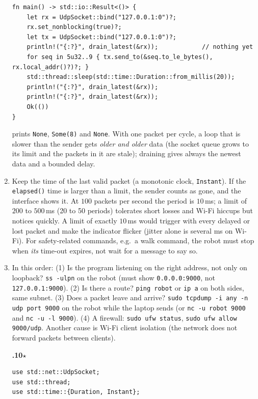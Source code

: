 \begin{enumerate}[label=\textbf{\ansnum.\arabic*}]
\begin{verbatim}
fn main() -> std::io::Result<()> {
    let rx = UdpSocket::bind("127.0.0.1:0")?;
    rx.set_nonblocking(true)?;
    let tx = UdpSocket::bind("127.0.0.1:0")?;
    println!("{:?}", drain_latest(&rx));            // nothing yet
    for seq in 5u32..9 { tx.send_to(&seq.to_le_bytes(), rx.local_addr()?)?; }
    std::thread::sleep(std::time::Duration::from_millis(20));
    println!("{:?}", drain_latest(&rx));
    println!("{:?}", drain_latest(&rx));
    Ok(())
}
\end{verbatim}
prints \verb!None!, \verb!Some(8)! and \verb!None!. With one packet per cycle, a loop that is slower than the sender gets \emph{older and older} data (the socket queue grows to its limit and the packets in it are stale); draining gives always the newest data and a bounded delay.
  \item Keep the time of the last valid packet (a monotonic clock, \verb!Instant!). If the \verb!elapsed()! time is larger than a limit, the sender counts as gone, and the interface shows it. At $100$ packets per second the period is $10$\,ms; a limit of $200$ to $500$\,ms (20 to 50 periods) tolerates short losses and Wi-Fi hiccups but notices quickly. A limit of exactly $10$\,ms would trigger with every delayed or lost packet and make the indicator flicker (jitter alone is several ms on Wi-Fi). For safety-related commands, e.g.\ a walk command, the robot must stop when \emph{its} time-out expires, not wait for a message to say so.
  \item In this order: (1) Is the program listening on the right address, not only on loopback? \verb!ss -ulpn! on the robot (must show \verb!0.0.0.0:9000!, not \verb!127.0.0.1:9000!). (2) Is there a route? \verb!ping robot! or \verb!ip a! on both sides, same subnet. (3) Does a packet leave and arrive? \verb!sudo tcpdump -i any -n udp port 9000! on the robot while the laptop sends (or \verb!nc -u robot 9000! and \verb!nc -u -l 9000!). (4) A firewall: \verb!sudo ufw status!, \verb!sudo ufw allow 9000/udp!. Another cause is Wi-Fi client isolation (the network does not forward packets between clients).
  \item[\textbf{\ansnum.10}$\star$]
\begin{verbatim}
use std::net::UdpSocket;
use std::thread;
use std::time::{Duration, Instant};


\end{verbatim}
\end{enumerate}
